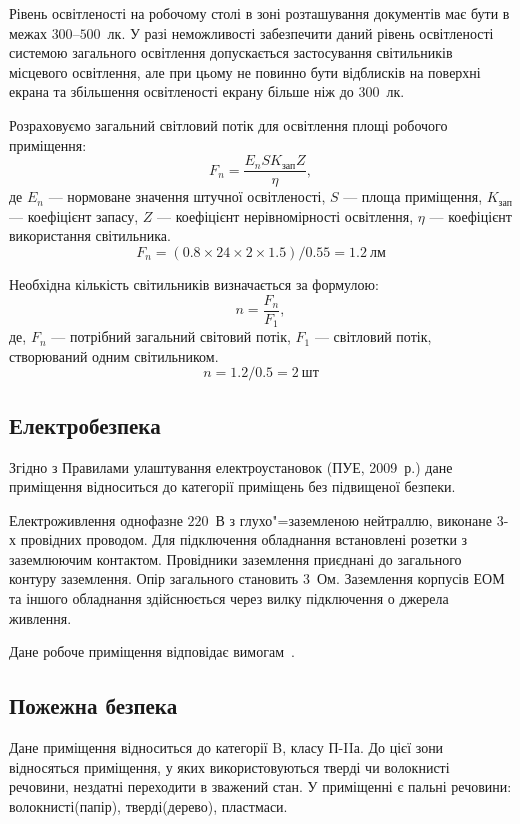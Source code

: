 \documentclass{diploma}
\begin{document}
      Рівень освітленості на робочому столі в зоні розташування документів має
      бути в межах $300$--$500$~лк.
      У разі неможливості забезпечити даний рівень освітленості системою
      загального освітлення допускається застосування світильників місцевого
      освітлення, але при цьому не повинно бути відблисків на поверхні екрана
      та збільшення освітленості екрану більше ніж до $300$~лк.

      Розраховуємо загальний світловий потік для освітлення площі робочого
      приміщення:
      \begin{equation}
        F_{n} = \frac{E_n S K_\text{зап} Z}{\eta},
        \label{eq:f-n}
      \end{equation}
      де $E_n$ --- нормоване значення штучної освітленості, $S$ --- площа
      приміщення, $K_\text{зап}$ --- коефіцієнт запасу, $Z$ --- коефіцієнт
      нерівномірності освітлення, $\eta$ --- коефіцієнт використання
      світильника.
      \[ F_{n} = (0.8 \times 24 \times 2 \times 1.5) / 0.55 = 1.2~\text{лм} \]

      Необхідна кількість світильників визначається за формулою:
      \begin{equation}
        n = \frac{F_n}{F_1},
        \label{eq:n}
      \end{equation}
      де, $F_n$ --- потрібний загальний світовий потік, $F_1$ --- світловий
      потік, створюваний одним світильником.
      \[ n = 1.2 / 0.5 = 2~\text{шт} \]
      \clearpage
    \subsection{Електробезпека}
      Згідно з Правилами улаштування електроустановок (ПУЕ, 2009~р.) дане
      приміщення відноситься до категорії приміщень без підвищеної безпеки.

      Електроживлення однофазне $220$~В з глухо"=заземленою нейтраллю,
      виконане 3-х провідних проводом.
      Для підключення обладнання встановлені розетки з заземлюючим контактом.
      Провідники заземлення приєднані до загального контуру заземлення.
      Опір загального становить $3$~Ом.
      Заземлення корпусів ЕОМ та іншого обладнання здійснюється через вилку
      підключення о джерела живлення.

      Дане робоче приміщення відповідає вимогам~\cite{dnaop131}.
    \subsection{Пожежна безпека}
      Дане приміщення відноситься до категорії B, класу П-IIа.
      До цієї зони відносяться приміщення, у яких використовуються тверді чи
      волокнисті речовини, нездатні переходити в зважений стан\cite{napb}.
      У приміщенні є пальні речовини: волокнисті(папір), тверді(дерево),
      пластмаси.
\end{document}
